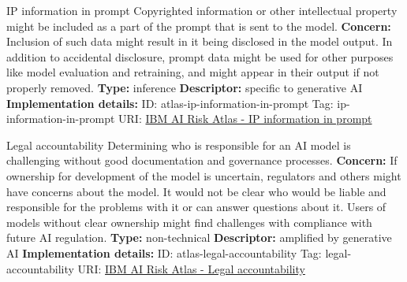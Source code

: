 \documentclass[a4paper,12pt]{article}
\begin{document}
\begin{definitionbox}{IP information in prompt}
Copyrighted information or other intellectual property might be included as a part of the prompt that is sent to the model.\newline\newline
\textbf{Concern: }Inclusion of such data might result in it being disclosed in the model output. In addition to accidental disclosure, prompt data might be used for other purposes like model evaluation and retraining, and might appear in their output if not properly removed.\newline\newline
\textbf{Type: }inference\newline
\textbf{Descriptor: }specific to generative AI \newline\newline
\textbf{Implementation details: } \newline
ID: atlas-ip-information-in-prompt \newline
Tag: ip-information-in-prompt \newline
URI:  \href{https://www.ibm.com/docs/en/watsonx/saas?topic=SSYOK8/wsj/ai-risk-atlas/ip-information-in-prompt.html}{IBM AI Risk Atlas - IP information in prompt}\newline
\end{definitionbox}
\begin{definitionbox}{Legal accountability}
Determining who is responsible for an AI model is challenging without good documentation and governance processes.\newline\newline
\textbf{Concern: }If ownership for development of the model is uncertain, regulators and others might have concerns about the model. It would not be clear who would be liable and responsible for the problems with it or can answer questions about it. Users of models without clear ownership might find challenges with compliance with future AI regulation.\newline\newline
\textbf{Type: }non-technical\newline
\textbf{Descriptor: }amplified by generative AI \newline\newline
\textbf{Implementation details: } \newline
ID: atlas-legal-accountability \newline
Tag: legal-accountability \newline
URI:  \href{https://www.ibm.com/docs/en/watsonx/saas?topic=SSYOK8/wsj/ai-risk-atlas/legal-accountability.html}{IBM AI Risk Atlas - Legal accountability}\newline
\end{definitionbox}
\end{document}
